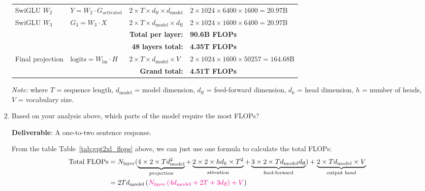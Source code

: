 \begin{enumerate}[label=(\alph*)]
\begin{table}[h]
{\begin{tabular}{llll}
    SwiGLU $W_2$ & $Y = W_2 \cdot G_{\text{activated}}$ & $2 \times T \times d_{\text{ff}} \times d_{\text{model}}$ & $2 \times 1024 \times 6400 \times 1600 = 20.97$B \\
    SwiGLU $W_3$ & $G_3 = W_3 \cdot X$ & $2 \times T \times d_{\text{model}} \times d_{\text{ff}}$ & $2 \times 1024 \times 1600 \times 6400 = 20.97$B \\
    \midrule
    \multicolumn{3}{r}{\textbf{Total per layer:}} & \textbf{90.6B FLOPs} \\
    \multicolumn{3}{r}{\textbf{48 layers total:}} & \textbf{4.35T FLOPs} \\
    \midrule
    Final projection & $\text{logits} = W_{\text{lm}} \cdot H$ & $2 \times T \times d_{\text{model}} \times V$ & $2 \times 1024 \times 1600 \times 50257 = 164.68$B \\
    \midrule
    \multicolumn{3}{r}{\textbf{Grand total:}} & \textbf{4.51T FLOPs} \\
    \bottomrule
    \end{tabular}
    }
    \end{table}
    {\small\textit{Note:} where $T$ = sequence length, $d_{\text{model}}$ = model dimension, $d_{\text{ff}}$ = feed-forward dimension, $d_k$ = head dimension, $h$ = number of heads, $V$ = vocabulary size.}
    
    \item Based on your analysis above, which parts of the model require the most FLOPs?
    
    \textbf{Deliverable}: A one-to-two sentence response.
    
    \begin{answer}
    From the table Table~\ref{tab:gpt2xl_flops} above, we can just use one formula to calculate the total FLOPs:
    \begin{equation*}
        \begin{aligned}
            \text{Total FLOPs} &= N_{\text{layer}} (
                \underbrace{4 \times 2 \times T d_{\text{model}}^2}_{\text{projection}} + 
                \underbrace{2 \times 2 \times h d_{k} \times T^2}_{\text{attention}} + 
                \underbrace{3 \times 2 \times T d_{\text{model}} d_{\text{ff}}}_{\text{feed-forward}}) + \underbrace{2 \times T d_{\text{model}} \times V}_{\text{output head}} \\
            &= 2 T d_{\text{model}} \left(
                {\color{magenta}N_{\text{layer}}  \left(
                    4 d_{\text{model}} + 2 T + 3 d_{\text{ff}}
                \right) + V}
            \right)
        \end{aligned}
    \end{equation*}


\end{answer}
\end{enumerate}
